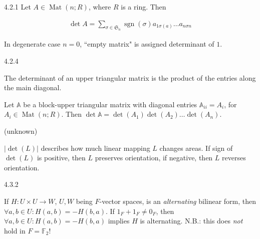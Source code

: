 \documentclass[10pt]{article} %
\DeclareMathOperator{\sgn}{sgn}
\DeclareMathOperator{\Mat}{Mat}
\begin{document}
\begin{multicols}{3}
\begin{definition}{4.2.1}{}
    Let $A \in \Mat(n;R)$, where $R$ is a ring. Then

        \begin{align*}
            \det{A} = \sum_{\sigma \in \mathfrak{S}_n} \sgn\!{(\sigma)}a_{1\sigma(a)}\hdots a_{n\sigma{n}}
        \end{align*}

    In degenerate case $n=0$, ``empty matrix" is assigned determinant of $1$.

\end{definition}

\begin{example}{4.2.4}{}

    The determinant of an upper triangular matrix is the product of the entries along the main diagonal.

\end{example}

%
%

\begin{exercise}{63}{}

    Let $\mathbb{A}$ be a block-upper triangular matrix with diagonal entries $\mathbb{A}_{ii} = A_i$, for $A_i \in \Mat(n;R)$. Then $\det{\mathbb{A}} = \det{(A_1)}\det{(A_2)}\hdots\det{(A_n)}$.

\end{exercise}

\begin{remark}{(unknown)}{}

    $|\det(L)|$ describes how much linear mapping $L$ changes areas. If sign of $\det(L)$ is positive, then $L$ preserves orientation, if negative, then $L$ reverses orientation.

\end{remark}

\begin{remark}{4.3.2}{}

    If $H: U \times U \to W$, $U,W$ being $F$-vector spaces, is an \emph{alternating} bilinear form, then $\forall a,b \in U: H(a,b) = -H(b,a)$. If $1_F + 1_F \neq 0_F$, then $\forall a,b \in U: H(a,b) = -H(b,a)$ implies $H$ is alternating. N.B.: this does \emph{not} hold in $F=\mathbb{F}_2$!


\end{remark}
\end{multicols}
\end{document}
